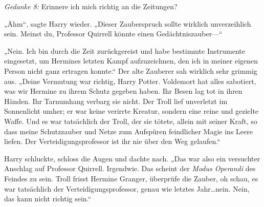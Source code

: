 \emph{Gedanke 8:} Erinnere ich mich richtig an die Zeitungen?

„Ähm“, sagte Harry wieder. „Dieser Zauberspruch sollte wirklich unverzeihlich sein. Meinst du, Professor Quirrell könnte einen Gedächtniszauber—“

„Nein. Ich bin durch die Zeit zurückgereist und habe bestimmte Instrumente eingesetzt, um Hermines letzten Kampf aufzuzeichnen, den ich in meiner eigenen Person nicht ganz ertragen konnte.“
Der alte Zauberer sah wirklich sehr grimmig aus.
„Deine Vermutung war richtig, Harry Potter. Voldemort hat alles sabotiert, was wir Hermine zu ihrem Schutz gegeben haben. Ihr Besen lag tot in ihren Händen. Ihr Tarnumhang verbarg sie nicht. Der Troll lief unverletzt im Sonnenlicht umher; er war keine verirrte Kreatur, sondern eine reine und gezielte Waffe. Und es war tatsächlich der Troll, der sie tötete, allein mit seiner Kraft, so dass meine Schutzzauber und Netze zum Aufspüren feindlicher Magie ins Leere liefen. Der Verteidigungsprofessor ist ihr nie über den Weg gelaufen.“

Harry schluckte, schloss die Augen und dachte nach.
„Das war also ein versuchter Anschlag auf Professor Quirrell. Irgendwie. Das scheint der \emph{Modus Operandi} des Feindes zu sein. Troll frisst Hermine Granger, überprüfe die Zauber, oh schau, es war tatsächlich der Verteidigungsprofessor, genau wie letztes Jahr…nein. Nein, das kann nicht richtig sein.“

